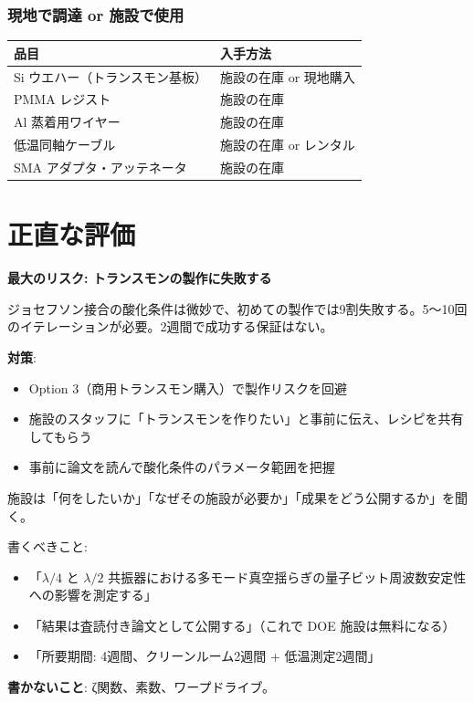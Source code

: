 \documentclass[12pt,a4paper]{article}
\begin{document}
\section{現地で調達 or 施設で使用}

\begin{center}
\renewcommand{\arraystretch}{1.3}
\begin{tabular}{ll}
\toprule
品目 & 入手方法 \\
\midrule
Si ウエハー（トランスモン基板） & 施設の在庫 or 現地購入 \\
PMMA レジスト & 施設の在庫 \\
Al 蒸着用ワイヤー & 施設の在庫 \\
低温同軸ケーブル & 施設の在庫 or レンタル \\
SMA アダプタ・アッテネータ & 施設の在庫 \\
\bottomrule
\end{tabular}
\end{center}

\part{正直な評価}

\begin{honestbox}[リスク]
\textbf{最大のリスク: トランスモンの製作に失敗する}

ジョセフソン接合の酸化条件は微妙で、初めての製作では9割失敗する。5〜10回のイテレーションが必要。2週間で成功する保証はない。

\textbf{対策}:
\begin{itemize}
\item Option 3（商用トランスモン購入）で製作リスクを回避
\item 施設のスタッフに「トランスモンを作りたい」と事前に伝え、レシピを共有してもらう
\item 事前に論文を読んで酸化条件のパラメータ範囲を把握
\end{itemize}
\end{honestbox}

\begin{honestbox}[プロポーザルのコツ]
施設は「何をしたいか」「なぜその施設が必要か」「成果をどう公開するか」を聞く。

書くべきこと:
\begin{itemize}
\item 「$\lambda/4$ と $\lambda/2$ 共振器における多モード真空揺らぎの量子ビット周波数安定性への影響を測定する」
\item 「結果は査読付き論文として公開する」（これで DOE 施設は無料になる）
\item 「所要期間: 4週間、クリーンルーム2週間 + 低温測定2週間」
\end{itemize}

\textbf{書かないこと}: ζ関数、素数、ワープドライブ。
\end{honestbox}
\end{document}
